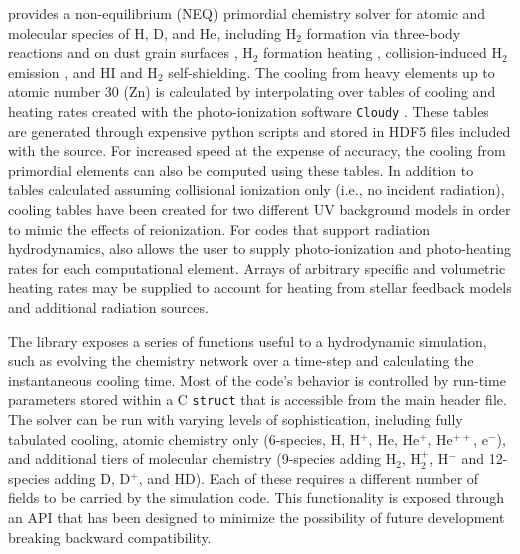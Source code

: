\grackle{} provides a non-equilibrium (NEQ) primordial chemistry solver for
atomic and molecular species of H, D, and He, including H$_{2}$
formation via three-body reactions \citep{2002Sci...295...93A,
2011ApJ...726...55T} and on dust grain surfaces
\citep{1979ApJS...41..555H, 2000ApJ...534..809O, 2014ApJ...783...75M},
H$_{2}$ formation 
heating \citep{2009Sci...325..601T}, collision-induced H$_{2}$
emission \citep{2004MNRAS.348.1019R}, and HI
\citep{2013MNRAS.430.2427R} and H$_{2}$ \citep{2012MNRAS.425L..51W}
self-shielding.  The cooling from heavy elements up to atomic number
30 (Zn) is calculated by interpolating over tables of cooling and
heating rates created with the photo-ionization software
\texttt{Cloudy} \citep{2013RMxAA..49..137F}.  These
tables are generated through expensive python scripts and stored in HDF5 files
included with the \grackle{} source.  For
increased speed at the expense of accuracy, the cooling from
primordial elements can also be computed using these tables.  In
addition to tables calculated assuming collisional ionization only
(i.e., no incident radiation), cooling tables have been created for two
different UV background models
\citep{2009ApJ...703.1416F, 2012ApJ...746..125H} in order to mimic the effects of
reionization.  For codes that
support radiation hydrodynamics, \grackle{} also allows the user to supply
photo-ionization and photo-heating rates for each computational
element.  Arrays of arbitrary specific and volumetric heating
rates may be supplied to account for heating from stellar feedback
models and additional radiation sources.

The \grackle{} library exposes a series of functions useful to a
hydrodynamic simulation, such as evolving the chemistry network over a
time-step and calculating the instantaneous cooling time.
Most of the
code's behavior is controlled by run-time parameters stored within a C
\texttt{struct} that is accessible from the main \grackle{} header
file.  The solver can be run with varying levels of sophistication,
including fully tabulated cooling, atomic chemistry only (6-species,
H, H$^{+}$, He, He$^{+}$, He$^{++}$, e$^{-}$), and additional tiers of
molecular chemistry (9-species adding H$_{2}$, H$_{2}^{+}$, H$^{-}$
and 12-species adding D, D$^{+}$, and HD).  Each of these requires a
different number of fields to be carried by the simulation code.  This
functionality is exposed through an API that has been designed to
minimize the possibility of future development breaking backward
compatibility.

